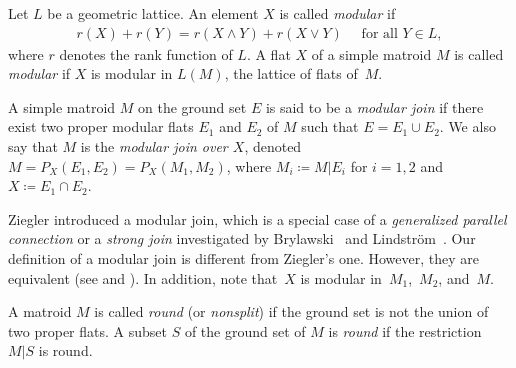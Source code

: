 \documentclass[11pt]{article}
\begin{document}
\setcounter{section}{1}
\setcounter{subsection}{0}
\setcounter{subsubsection}{0}
\setcounter{Theorem}{3}
\setcounter{equation}{0}
Let $ L $ be a geometric lattice.
An element $ X $ is called \textit{modular} if
\begin{gather*}
r(X) + r(Y) = r(X \wedge Y) + r(X \vee Y) \quad \text{ for all } Y \in L,
\end{gather*}
where $ r $ denotes the rank function of $ L $.
A flat $ X $ of a simple matroid $ M $ is called \textit{modular} if $ X $ is modular in $ L(M) $, the lattice of flats of~$ M $.

\begin{Definition}
A simple matroid $ M $ on the ground set $ E $ is said to be a \textit{modular join} if there exist two proper modular flats $ E_{1} $ and $ E_{2} $ of $ M $ such that $ E = E_{1} \cup E_{2} $.
We also say that $ M $ is the \textit{modular join over $ X $}, denoted $ M = P_{X}(E_{1}, E_{2}) = P_{X}(M_{1}, M_{2}) $, where $ M_{i} \coloneqq M|E_{i} $ for $ i = 1,2 $ and $ X \coloneqq E_{1} \cap E_{2} $.
\end{Definition}

\begin{Remark}
Ziegler \cite{ziegler1991binary-potams} introduced a modular join, which is a special case of a \textit{generalized parallel connection} or a \textit{strong join} investigated by Brylawski~\cite{brylawski1975modular-totams} and Lindstr{\"o}m~\cite{lindstrom1978strong-joctsa}.
Our definition of a modular join is different from Ziegler's one.
However, they are equivalent (see \cite[Propositioin~3.3]{ziegler1991binary-potams} and \cite[Proposition~5.10]{brylawski1975modular-totams}).
In addition, note that~$ X $ is modular in~$ M_{1}$,~$M_{2} $, and~$ M $.
\end{Remark}

\begin{Definition}A matroid $ M $ is called \textit{round} (or \textit{nonsplit}) if the ground set is not the union of two proper flats. A subset $ S $ of the ground set of $ M $ is \textit{round} if the restriction $ M|S $ is round.
\end{Definition}
\end{document}
